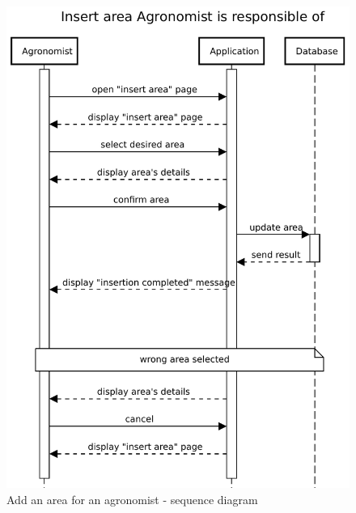 \begin{figure}[H]
    \centering
    \includegraphics[scale=0.75]{Images/Sequence diagrams/Agronomist - Insert area.pdf}

    \caption{Add an area for an agronomist - sequence diagram}
    \label{fig:fig:seq_diag_insert_area}

    
\end{figure}


